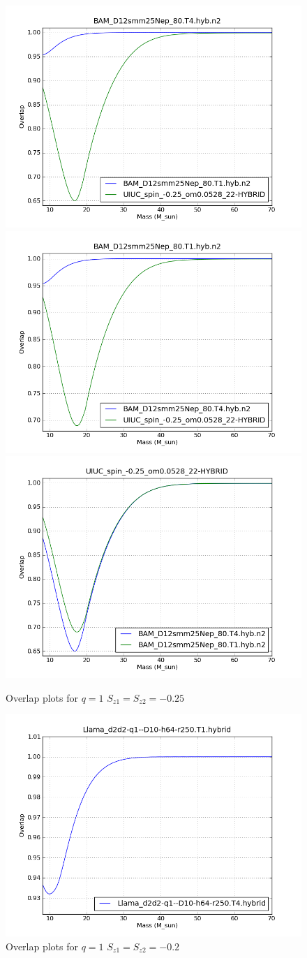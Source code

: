 \begin{figure}
  \includegraphics[width=0.5\linewidth]{figures/ninja2/figure_1_-0d25_02.png} 
  \includegraphics[width=0.5\linewidth]{figures/ninja2/figure_1_-0d25_04.png} \\
  \includegraphics[width=0.5\linewidth]{figures/ninja2/figure_1_-0d25_06.png} 
  \caption[Overlap plots for $q=1$ $S_{z1} = S_{z2} = -0.25$]{
  \label{f:figure_1_-0d25}
Overlap plots for $q=1$ $S_{z1} = S_{z2} = -0.25$}
\end{figure}%


\begin{figure}
  \includegraphics[width=\linewidth]{figures/ninja2/figure_1_-0d2_01.png}
  \caption[Overlap plots for $q=1$ $S_{z1} = S_{z2} = -0.2$]{
  \label{f:figure_1_-0d2}
Overlap plots for $q=1$ $S_{z1} = S_{z2} = -0.2$}
\end{figure}%


